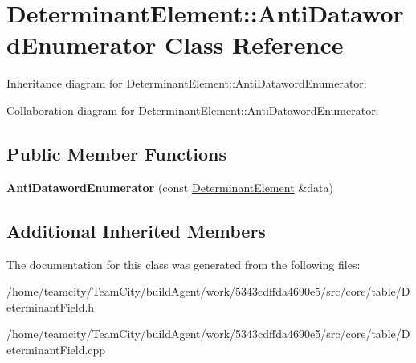 \hypertarget{classDeterminantElement_1_1AntiDatawordEnumerator}{}\section{Determinant\+Element\+:\+:Anti\+Dataword\+Enumerator Class Reference}
\label{classDeterminantElement_1_1AntiDatawordEnumerator}


Inheritance diagram for Determinant\+Element\+:\+:Anti\+Dataword\+Enumerator\+:


Collaboration diagram for Determinant\+Element\+:\+:Anti\+Dataword\+Enumerator\+:
\subsection*{Public Member Functions}
\begin{DoxyCompactItemize}
\item 
{\bfseries Anti\+Dataword\+Enumerator} (const \hyperlink{classDeterminantElement}{Determinant\+Element} \&data)\hypertarget{classDeterminantElement_1_1AntiDatawordEnumerator_a09e78d2e57f66b5b7186ac7979c877ba}{}\label{classDeterminantElement_1_1AntiDatawordEnumerator_a09e78d2e57f66b5b7186ac7979c877ba}

\end{DoxyCompactItemize}
\subsection*{Additional Inherited Members}


The documentation for this class was generated from the following files\+:\begin{DoxyCompactItemize}
\item 
/home/teamcity/\+Team\+City/build\+Agent/work/5343cdffda4690e5/src/core/table/Determinant\+Field.\+h\item 
/home/teamcity/\+Team\+City/build\+Agent/work/5343cdffda4690e5/src/core/table/Determinant\+Field.\+cpp\end{DoxyCompactItemize}
